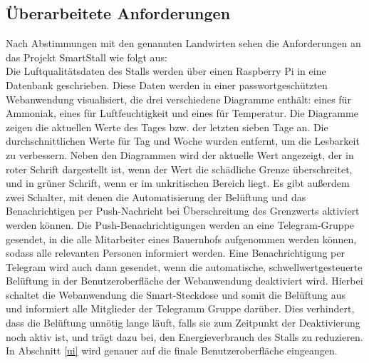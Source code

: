 \documentclass[conference]{IEEEtran}
\begin{document}
\subsection{Überarbeitete Anforderungen}
Nach Abstimmungen mit den genannten Landwirten sehen die Anforderungen an das Projekt SmartStall wie folgt aus: \\
Die Luftqualitätsdaten des Stalls werden über einen Raspberry Pi in eine Datenbank geschrieben. Diese Daten werden in einer passwortgeschützten Webanwendung visualisiert, die drei verschiedene Diagramme enthält: eines für Ammoniak, eines für Luftfeuchtigkeit und eines für Temperatur. Die Diagramme zeigen die aktuellen Werte des Tages bzw. der letzten sieben Tage an. Die durchschnittlichen Werte für Tag und Woche wurden entfernt, um die Lesbarkeit zu verbessern.
Neben den Diagrammen wird der aktuelle Wert angezeigt, der in roter Schrift dargestellt ist, wenn der Wert die schädliche Grenze überschreitet, und in grüner Schrift, wenn er im unkritischen Bereich liegt. Es gibt außerdem zwei Schalter, mit denen die Automatisierung der Belüftung und das Benachrichtigen per Push-Nachricht bei Überschreitung des Grenzwerts aktiviert werden können.
Die Push-Benachrichtigungen werden an eine Telegram-Gruppe gesendet, in die alle Mitarbeiter eines Bauernhofs aufgenommen werden können, sodass alle relevanten Personen informiert werden. Eine Benachrichtigung per Telegram wird auch dann gesendet, wenn die automatische, schwellwertgesteuerte Belüftung in der Benutzeroberfläche der Webanwendung deaktiviert wird. Hierbei schaltet die Webanwendung die Smart-Steckdose und somit die Belüftung aus und informiert alle Mitglieder der Telegramm Gruppe darüber. Dies verhindert, dass die Belüftung unnötig lange läuft, falls sie zum Zeitpunkt der Deaktivierung noch aktiv ist, und trägt dazu bei, den Energieverbrauch des Stalls zu reduzieren. In Abschnitt \ref{ui} wird genauer auf die finale Benutzeroberfläche eingeangen.
\end{document}
